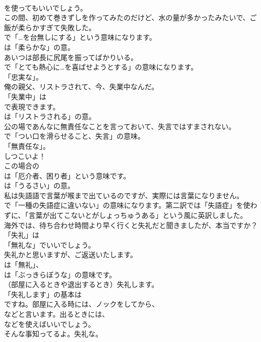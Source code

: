 \documentclass[8pt]{extreport}
\begin{document}
\begin{CJK}{UTF8}{min}
\\	を使ってもいいでしょう。	
\\	この間、初めて巻きずしを作ってみたのだけど、水の量が多かったみたいで、ご飯が柔らかすぎて失敗した。 
\\	で「…を台無しにする」という意味になります。
\\	は「柔らかな」の意。	
\\	あいつは部長に尻尾を振ってばかりいる。 
\\	で「とても熱心に…を喜ばせようとする」の意味になります。
\\	「忠実な」。	
\\	俺の親父、リストラされて、今、失業中なんだ。 
\\	「失業中」は 
\\	で表現できます。
\\	は「リストラされる」の意。	
\\	公の場であんなに無責任なことを言っておいて、失言ではすまされない。 
\\	で「つい口を滑らせること、失言」の意味。
\\	「無責任な」。	
\\	しつこいよ！ 
\\	この場合の
\\	は「厄介者、困り者」という意味です。
\\	は「うるさい」の意。	
\\	私は失語語で言葉が喉まで出ているのですが、実際には言葉になりません。 
\\	で「一種の失語症に違いない」の意味になります。第二訳では「失語症」を使わずに、「言葉が出てこないとがしょっちゅうある」という風に英訳しました。	
\\	海外では、待ち合わせ時間より早く行くと失礼だと聞きましたが、本当ですか？ 
\\	「失礼」は
\\	「無礼な」でいいでしょう。	
\\	失礼かと思いますが、ご返送いたします。 
\\	は「無礼」、
\\	は「ぶっきらぼうな」の意味です。	
\\	（部屋に入るときや退出するとき）失礼します。 
\\	「失礼します」の基本は
\\	ですね。部屋に入る時には、ノックをしてから、
\\	などと言います。出るときには、
\\	などを使えばいいでしょう。	
\\	そんな事知ってるよ。失礼な。 

\end{CJK}
\end{document}

